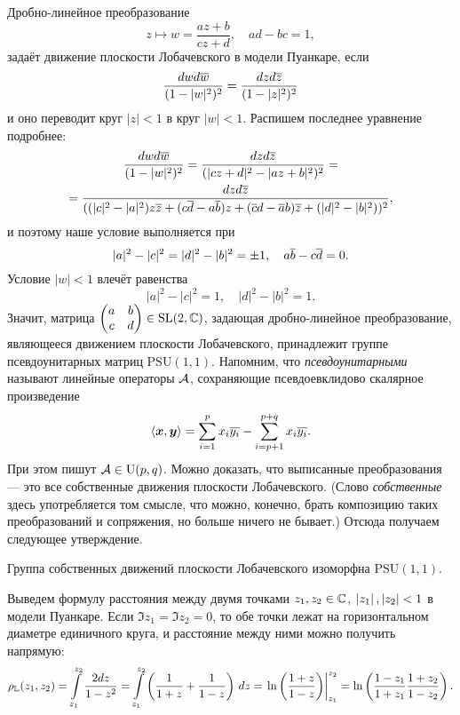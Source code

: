 \noindent
Дробно-линейное преобразование
\[
	z \mapsto w = \frac{az + b}{cz + d},\quad ad - bc = 1,
\]
задаёт движение плоскости Лобачевского в модели Пуанкаре, если
\[
	\frac{dwd\overline{w}}{(1 - |w|^2)^2} = \frac{dzd\overline{z}}{(1 - |z|^2)^2}
\]
и оно переводит круг $|z| < 1$ в круг $|w| < 1$. Распишем последнее уравнение подробнее:
\begin{multline*}
	\frac{dwd\overline{w}}{(1 - |w|^2)^2} = \frac{dzd\overline{z}}{(|cz + d|^2 - |az + b|^2)^2} =\\ = \frac{dzd\overline{z}}{((|c|^2 - |a|^2)z\overline{z} + (c\overline{d} - a\overline{b})z + (\overline{c}d - \overline{a}b)\overline{z} + (|d|^2 - |b|^2))^2},
\end{multline*}
и поэтому наше условие выполняется при
\[
	|a|^2 - |c|^2 = |d|^2 - |b|^2 = \pm 1,\quad a\overline{b} - c\overline{d} = 0.
\]
Условие $|w| < 1$ влечёт равенства
\[
	|a|^2 - |c|^2 = 1,\quad |d|^2 - |b|^2 = 1.
\]
Значит, матрица
$\begin{pmatrix}
	a & b\\
	c & d
\end{pmatrix} \in \mathrm{SL}(2, \mathbb{C})$, задающая дробно-линейное преобразование, являющееся движением плоскости Лобачевского, принадлежит группе псевдоунитарных матриц $\mathrm{PSU}(1, 1)$. Напомним, что \textit{псевдоунитарными} называют линейные операторы $\mathcal{A}$, сохраняющие псевдоевклидово скалярное произведение
\[
	\langle\boldsymbol{x}, \boldsymbol{y}\rangle = \sum_{i = 1}^px_i\overline{y_i} - \sum_{i = p + 1}^{p + q}x_i\overline{y_i}.
\]
При этом пишут $\mathcal{A} \in \mathrm{U}(p, q)$. Можно доказать, что выписанные преобразования --- это все собственные движения плоскости Лобачевского. (Слово \textit{собственные} здесь употребляется том смысле, что можно, конечно, брать композицию таких преобразований и сопряжения, но больше ничего не бывает.) Отсюда получаем следующее утверждение.

\begin{theorem}
	Группа собственных движений плоскости Лобачевского изоморфна $\mathrm{PSU}(1, 1)$.
\end{theorem}

Выведем формулу расстояния между двумя точками $z_1, z_2 \in \mathbb{C}$, $\left\lvert z_1\right\rvert, \left\lvert z_2\right\rvert < 1$ в модели Пуанкаре. Если $\Im z_1 = \Im z_2 = 0$, то обе точки лежат на горизонтальном диаметре единичного круга, и расстояние между ними можно получить напрямую:
\[
	\rho_{\mathbb{L}}(z_1, z_2) = \int\limits_{z_1}^{z_2}\frac{2dz}{1 - z^2} = \int\limits_{z_1}^{z_2}\left(\frac{1}{1 + z} + \frac{1}{1 - z}\right)\,dz = \left.\ln\left(\frac{1 + z}{1 - z}\right)\right|_{z_1}^{z_2} = \ln\left(\frac{1 - z_1}{1 + z_1}\frac{1 + z_2}{1 - z_2}\right).
\]

